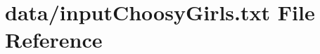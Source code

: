 \hypertarget{inputChoosyGirls_8txt}{}\section{data/input\+Choosy\+Girls.txt File Reference}
\label{inputChoosyGirls_8txt}
